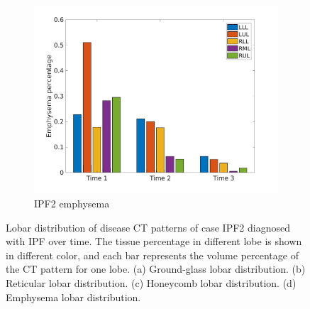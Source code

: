 \begin{figure}[H]
\begin{subfigure}{.46\linewidth}
  \includegraphics[width=\linewidth,trim={{.0\wd0} {.0\wd0} {.0\wd0} {.0\wd0}},clip]{Appendix/Image_AppexA/LobarDistribution/IPF2EmphysemaLobarRegionDiseaseDistributionOverTime.jpg}
  \caption{IPF2 emphysema}
  \label{fig:IPF2LobarRegionDiseaseDistributionOverTime-d}
\end{subfigure}
\caption{Lobar distribution of disease CT patterns of case IPF2 diagnosed with IPF over time. The tissue percentage in different lobe is shown in different color, and each bar represents the volume percentage of the CT pattern for one lobe. (a) Ground-glass lobar distribution. (b) Reticular lobar distribution. (c) Honeycomb lobar distribution. (d) Emphysema lobar distribution.}
\label{fig:IPF2LobarRegionDiseaseDistributionOverTime}
\end{figure}

